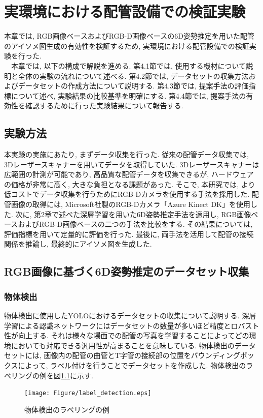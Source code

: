 ﻿\chapter{実環境における配管設備での検証実験}
本章では, RGB画像ベースおよびRGB-D画像ベースの6D姿勢推定を用いた配管のアイソメ図生成の有効性を検証するため, 実環境における配管設備での検証実験を行った. \\
　本章では, 以下の構成で解説を進める. 
第4.1節では, 使用する機材について説明と全体の実験の流れについて述べる. 
第4.2節では, データセットの収集方法およびデータセットの作成方法について説明する. 
第4.3節では, 提案手法の評価指標について述べ, 実験結果の比較基準を明確にする. 
第4.4節では, 提案手法の有効性を確認するために行った実験結果について報告する. 

\section{実験方法}
本実験の実施にあたり, まずデータ収集を行った. 
従来の配管データ収集では, 3Dレーザースキャナーを用いてデータを取得していた. 
3Dレーザースキャナーは広範囲の計測が可能であり, 高品質な配管データを収集できるが, ハードウェアの価格が非常に高く, 大きな負担となる課題があった. 
そこで, 本研究では, より低コストでデータ収集を行うためにRGB-Dカメラを使用する手法を採用した. 
配管画像の取得には, Microsoft社製のRGB-Dカメラ「Azure Kinect DK」を使用した. 
次に, 第2章で述べた深層学習を用いた6D姿勢推定手法を適用し, RGB画像ベースおよびRGB-D画像ベースの二つの手法を比較をする. 
その結果については, 評価指標を用いて定量的に評価を行った. 
最後に, 両手法を活用して配管の接続関係を推論し, 最終的にアイソメ図を生成した. 

\section{RGB画像に基づく6D姿勢推定のデータセット収集}

\subsection{物体検出}
物体検出に使用したYOLOにおけるデータセットの収集について説明する. 
深層学習による認識ネットワークにはデータセットの数量が多いほど精度とロバスト性が向上する. 
それは様々な場面での配管の写真を学習することによってどの環境においても対応できる汎用性が高まることを意味している.
物体検出のデータセットには, 画像内の配管の曲管とT字管の接続部の位置をバウンディングボックスによって, ラベル付けを行うことでデータセットを作成した. 
物体検出のラベリングの例を図\ref{fig:4-f1}に示す. 
\begin{figure}[htbt]
	\centering
	 \texttt{[image: Figure/label\_detection.eps]}
	 \caption{物体検出のラベリングの例}
	 \label{fig:4-f1}
\end{figure}

